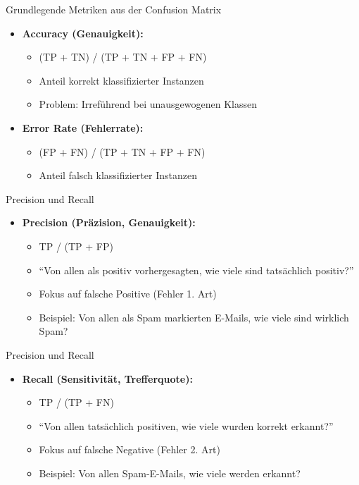 \documentclass[
  ignorenonframetext,
]{beamer}
\providecommand{\tightlist}{%
  \setlength{\itemsep}{0pt}\setlength{\parskip}{0pt}}
\begin{document}
\begin{frame}{Grundlegende Metriken aus der Confusion Matrix}
\protect{}\label{grundlegende-metriken-aus-der-confusion-matrix}
\begin{itemize}
\tightlist
\item
  \textbf{Accuracy (Genauigkeit):}

  \begin{itemize}
  \tightlist
  \item
    (TP + TN) / (TP + TN + FP + FN)
  \item
    Anteil korrekt klassifizierter Instanzen
  \item
    Problem: Irreführend bei unausgewogenen Klassen
  \end{itemize}
\item
  \textbf{Error Rate (Fehlerrate):}

  \begin{itemize}
  \tightlist
  \item
    (FP + FN) / (TP + TN + FP + FN)
  \item
    Anteil falsch klassifizierter Instanzen
  \end{itemize}
\end{itemize}
\end{frame}

\begin{frame}{Precision und Recall}
\protect{}\label{precision-und-recall}
\begin{itemize}
\tightlist
\item
  \textbf{Precision (Präzision, Genauigkeit):}

  \begin{itemize}
  \tightlist
  \item
    TP / (TP + FP)
  \item
    ``Von allen als positiv vorhergesagten, wie viele sind tatsächlich
    positiv?''
  \item
    Fokus auf falsche Positive (Fehler 1. Art)
  \item
    Beispiel: Von allen als Spam markierten E-Mails, wie viele sind
    wirklich Spam?
  \end{itemize}
\end{itemize}
\end{frame}

\begin{frame}{Precision und Recall}
\protect{}\label{precision-und-recall-1}
\begin{itemize}
\tightlist
\item
  \textbf{Recall (Sensitivität, Trefferquote):}

  \begin{itemize}
  \tightlist
  \item
    TP / (TP + FN)
  \item
    ``Von allen tatsächlich positiven, wie viele wurden korrekt
    erkannt?''
  \item
    Fokus auf falsche Negative (Fehler 2. Art)
  \item
    Beispiel: Von allen Spam-E-Mails, wie viele werden erkannt?
  \end{itemize}
\end{itemize}
\end{frame}
\end{document}

